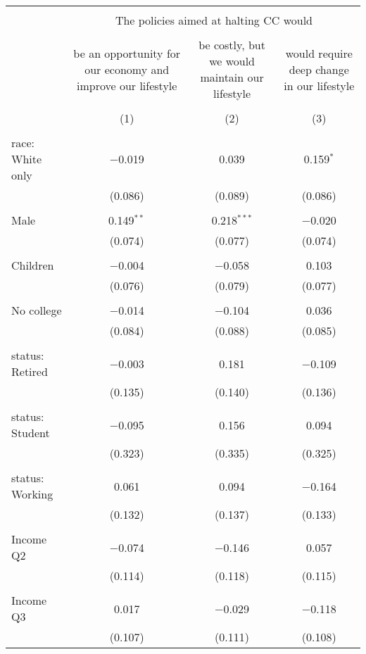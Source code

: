 
\begin{tabular}{@{\extracolsep{5pt}}lccc} 
\\[-1.8ex]\hline 
\hline \\[-1.8ex] 
 & \multicolumn{3}{c}{The policies aimed at halting CC would } \\ 
\cline{2-4} 
\\[-1.8ex] & be an opportunity for our economy and improve our lifestyle & be costly, but we would maintain our lifestyle & would require deep change in our lifestyle \\ 
\\[-1.8ex] & (1) & (2) & (3)\\ 
\hline \\[-1.8ex] 
 race: White only & $-$0.019 & 0.039 & 0.159$^{*}$ \\ 
  & (0.086) & (0.089) & (0.086) \\ 
  & & & \\ 
 Male & 0.149$^{**}$ & 0.218$^{***}$ & $-$0.020 \\ 
  & (0.074) & (0.077) & (0.074) \\ 
  & & & \\ 
 Children & $-$0.004 & $-$0.058 & 0.103 \\ 
  & (0.076) & (0.079) & (0.077) \\ 
  & & & \\ 
 No college & $-$0.014 & $-$0.104 & 0.036 \\ 
  & (0.084) & (0.088) & (0.085) \\ 
  & & & \\ 
 status: Retired & $-$0.003 & 0.181 & $-$0.109 \\ 
  & (0.135) & (0.140) & (0.136) \\ 
  & & & \\ 
 status: Student & $-$0.095 & 0.156 & 0.094 \\ 
  & (0.323) & (0.335) & (0.325) \\ 
  & & & \\ 
 status: Working & 0.061 & 0.094 & $-$0.164 \\ 
  & (0.132) & (0.137) & (0.133) \\ 
  & & & \\ 
 Income Q2 & $-$0.074 & $-$0.146 & 0.057 \\ 
  & (0.114) & (0.118) & (0.115) \\ 
  & & & \\ 
 Income Q3 & 0.017 & $-$0.029 & $-$0.118 \\ 
  & (0.107) & (0.111) & (0.108) \\ 

\end{tabular}
